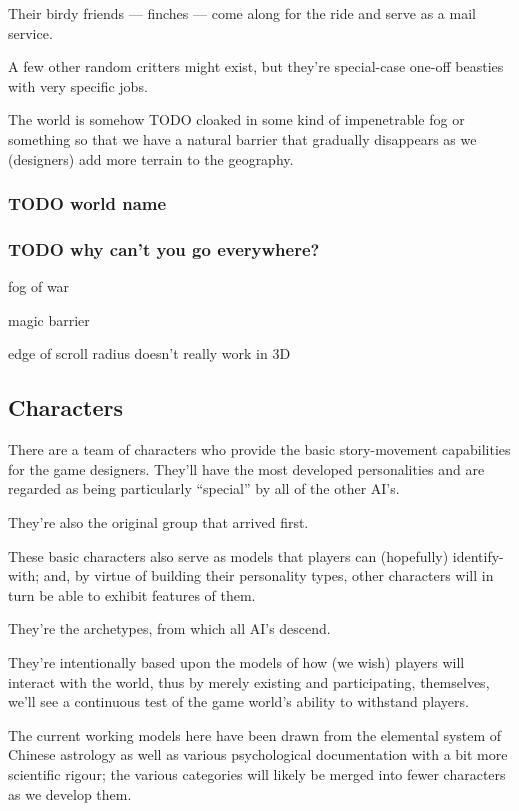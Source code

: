 \documentclass[11pt]{article}
\begin{document}
Their birdy friends --- finches --- come along for the ride and serve
as a mail service.

A few other random critters might exist, but they're special-case
one-off beasties with very specific jobs.

The world is somehow TODO cloaked in some kind of impenetrable fog or
something so that we have a natural barrier that gradually disappears
as we (designers) add more terrain to the geography.

\subsubsection{{\bfseries\sffamily TODO} world name}
\label{sec-2-1-1}

\subsubsection{{\bfseries\sffamily TODO} why can't you go everywhere?}
\label{sec-2-1-2}

fog of war

magic barrier

edge of scroll radius doesn't really work in 3D
\subsection{Characters}
\label{sec-2-2}

There are a team of characters who provide the basic story-movement
capabilities for the game designers. They'll have the most developed
personalities and are regarded as being particularly “special” by all
of the other AI's.

They're also the original group that arrived first.

These basic characters also serve as models that players can
(hopefully) identify-with; and, by virtue of building their
personality types, other characters will in turn be able to exhibit
features of them.

They're the archetypes, from which all AI's descend.

They're intentionally based upon the models of how (we wish) players
will interact with the world, thus by merely existing and
participating, themselves, we'll see a continuous test of the game
world's ability to withstand players.

The current working models here have been drawn from the elemental
system of Chinese astrology as well as various psychological
documentation with a bit more scientific rigour; the various
categories will likely be merged into fewer characters as we
develop them.
\end{document}
